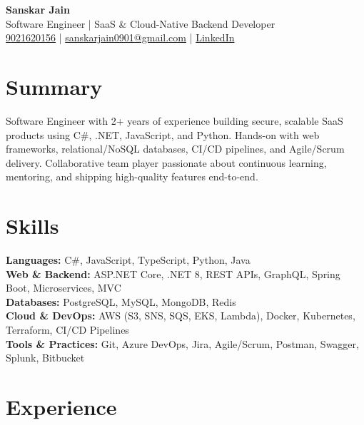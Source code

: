 \documentclass[letterpaper,10pt]{article}
\begin{document}
\begin{center}
    {\LARGE \textbf{Sanskar Jain}} \\
    \vspace{2pt}
    Software Engineer | SaaS \& Cloud-Native Backend Developer \\
    \vspace{2pt}
    \href{tel:9021620156}{9021620156} \;|\;
    \href{mailto:sanskarjain0901@gmail.com}{sanskarjain0901@gmail.com} \;|\;
    \href{https://www.linkedin.com/in/sanskar-jain0901/}{LinkedIn}
\end{center}

\vspace{3pt}

\section*{Summary}
Software Engineer with 2+ years of experience building secure, scalable SaaS products using C\#, .NET, JavaScript, and Python. Hands-on with web frameworks, relational/NoSQL databases, CI/CD pipelines, and Agile/Scrum delivery. Collaborative team player passionate about continuous learning, mentoring, and shipping high-quality features end-to-end.

\section*{Skills}
\textbf{Languages:} C\#, JavaScript, TypeScript, Python, Java \\
\textbf{Web \& Backend:} ASP.NET Core, .NET 8, REST APIs, GraphQL, Spring Boot, Microservices, MVC \\
\textbf{Databases:} PostgreSQL, MySQL, MongoDB, Redis \\
\textbf{Cloud \& DevOps:} AWS (S3, SNS, SQS, EKS, Lambda), Docker, Kubernetes, Terraform, CI/CD Pipelines \\
\textbf{Tools \& Practices:} Git, Azure DevOps, Jira, Agile/Scrum, Postman, Swagger, Splunk, Bitbucket

\section*{Experience}
\end{document}
